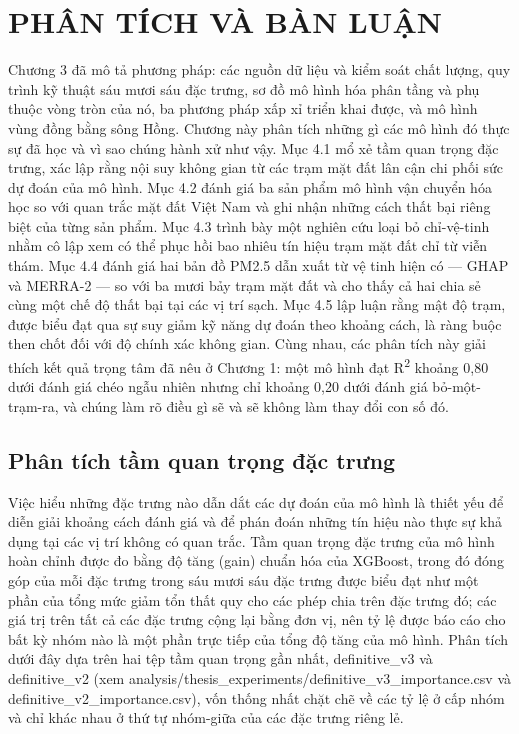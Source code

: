 \chapter{PHÂN TÍCH VÀ BÀN LUẬN}
\label{chuong4}


Chương 3 đã mô tả phương pháp: các nguồn dữ liệu và kiểm soát chất lượng, quy trình kỹ thuật sáu mươi sáu đặc trưng, sơ đồ mô hình hóa phân tầng và phụ thuộc vòng tròn của nó, ba phương pháp xấp xỉ triển khai được, và mô hình vùng đồng bằng sông Hồng. Chương này phân tích những gì các mô hình đó thực sự đã học và vì sao chúng hành xử như vậy. Mục 4.1 mổ xẻ tầm quan trọng đặc trưng, xác lập rằng nội suy không gian từ các trạm mặt đất lân cận chi phối sức dự đoán của mô hình. Mục 4.2 đánh giá ba sản phẩm mô hình vận chuyển hóa học so với quan trắc mặt đất Việt Nam và ghi nhận những cách thất bại riêng biệt của từng sản phẩm. Mục 4.3 trình bày một nghiên cứu loại bỏ chỉ-vệ-tinh nhằm cô lập xem có thể phục hồi bao nhiêu tín hiệu trạm mặt đất chỉ từ viễn thám. Mục 4.4 đánh giá hai bản đồ PM2.5 dẫn xuất từ vệ tinh hiện có --- GHAP và MERRA-2 --- so với ba mươi bảy trạm mặt đất và cho thấy cả hai chia sẻ cùng một chế độ thất bại tại các vị trí sạch. Mục 4.5 lập luận rằng mật độ trạm, được biểu đạt qua sự suy giảm kỹ năng dự đoán theo khoảng cách, là ràng buộc then chốt đối với độ chính xác không gian. Cùng nhau, các phân tích này giải thích kết quả trọng tâm đã nêu ở Chương 1: một mô hình đạt R\textsuperscript{2} khoảng 0,80 dưới đánh giá chéo ngẫu nhiên nhưng chỉ khoảng 0,20 dưới đánh giá bỏ-một-trạm-ra, và chúng làm rõ điều gì sẽ và sẽ không làm thay đổi con số đó.


\section{Phân tích tầm quan trọng đặc trưng}

Việc hiểu những đặc trưng nào dẫn dắt các dự đoán của mô hình là thiết yếu để diễn giải khoảng cách đánh giá và để phán đoán những tín hiệu nào thực sự khả dụng tại các vị trí không có quan trắc. Tầm quan trọng đặc trưng của mô hình hoàn chỉnh được đo bằng độ tăng (gain) chuẩn hóa của XGBoost, trong đó đóng góp của mỗi đặc trưng trong sáu mươi sáu đặc trưng được biểu đạt như một phần của tổng mức giảm tổn thất quy cho các phép chia trên đặc trưng đó; các giá trị trên tất cả các đặc trưng cộng lại bằng đơn vị, nên tỷ lệ được báo cáo cho bất kỳ nhóm nào là một phần trực tiếp của tổng độ tăng của mô hình. Phân tích dưới đây dựa trên hai tệp tầm quan trọng gần nhất, definitive\_v3 và definitive\_v2 (xem analysis/thesis\_experiments/definitive\_v3\_importance.csv và definitive\_v2\_importance.csv), vốn thống nhất chặt chẽ về các tỷ lệ ở cấp nhóm và chỉ khác nhau ở thứ tự nhóm-giữa của các đặc trưng riêng lẻ.

